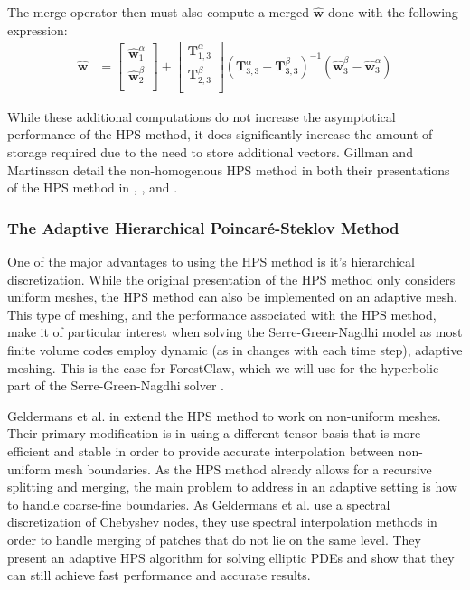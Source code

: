 The merge operator then must also compute a merged $\hat{\textbf{w}}$ done with the following expression:
\begin{align}
    \hat{\textbf{w}} &=
    \begin{bmatrix}
        \hat{\textbf{w}}_1^{\alpha} \\
        \hat{\textbf{w}}_2^{\beta} \\
    \end{bmatrix} +
    \begin{bmatrix}
        \textbf{T}_{1,3}^{\alpha} \\
        \textbf{T}_{2,3}^{\beta} \\
    \end{bmatrix}
    (\textbf{T}_{3,3}^{\alpha} - \textbf{T}_{3,3}^{\beta})^{-1} (\hat{\textbf{w}}_3^{\beta} - \hat{\textbf{w}}_3^{\alpha})
\end{align}

While these additional computations do not increase the asymptotical performance of the HPS method, it does significantly increase the amount of storage required due to the need to store additional vectors. Gillman and Martinsson detail the non-homogenous HPS method in both their presentations of the HPS method in \citep{gillman2014direct}, \citep{martinsson2015hierarchical}, and \citep{martinsson2019fast}.

\subsubsection{The Adaptive Hierarchical Poincaré-Steklov Method}

One of the major advantages to using the HPS method is it's hierarchical discretization. While the original presentation of the HPS method only considers uniform meshes, the HPS method can also be implemented on an adaptive mesh. This type of meshing, and the performance associated with the HPS method, make it of particular interest when solving the Serre-Green-Nagdhi model as most finite volume codes employ dynamic (as in changes with each time step), adaptive meshing. This is the case for ForestClaw, which we will use for the hyperbolic part of the Serre-Green-Nagdhi solver \citep{calhoun2017forestclaw}.

Geldermans et al. in \citep{geldermans2019adaptive} extend the HPS method to work on non-uniform meshes. Their primary modification is in using a different tensor basis that is more efficient and stable in order to provide accurate interpolation between non-uniform mesh boundaries. As the HPS method already allows for a recursive splitting and merging, the main problem to address in an adaptive setting is how to handle coarse-fine boundaries. As Geldermans et al. use a spectral discretization of Chebyshev nodes, they use spectral interpolation methods in order to handle merging of patches that do not lie on the same level. They present an adaptive HPS algorithm for solving elliptic PDEs and show that they can still achieve fast performance and accurate results.

